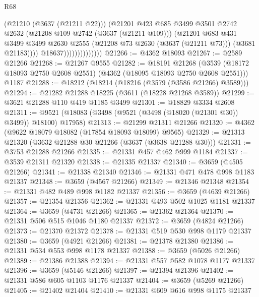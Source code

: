 \begin{lexlean}{R68}
\begin{coremodule}
                                  (@21210 (@3637 (@21211 @22)))
                                  (@21201
                                    @423
                                    @685
                                    @3499
                                    @3501
                                    @2742
                                    @2632
                                    (@21208 @109 @2742 (@3637 (@21211 @109)))
                                    (@21201
                                      @683
                                      @431
                                      @3499
                                      @3499
                                      @2630
                                      @2555
                                      (@21208 @73 @2630 (@3637 (@21211 @73)))
                                      (@3681 @21183))))
                                @18637))))))))))))))
@21266 := @4362 @18093
@21267 := @2589 @21266
@21268 := @21267 @9555
@21282 := @18191
    @21268
    (@3539 (@18172 @18093 @2750 @2608 @2551) (@4362 (@18095 @18093 @2750 @2608 @2551)))
    @1187
@21288 := @18212 (@18214 (@18216 (@3579 (@3586 @21266) @3589)))
@21294 := @21282 @21288 @18225 (@3611 (@18228 @21268 @3589))
@21299 := @3621 @21288 @110 @419 @1185 @3499
@21301 := @18829 @3334 @2608
@21311 := @9521 (@18083 (@3498 (@9521 (@3498 (@18020 (@21301 @30)) @3499)) @18100) @17958)
@21313 := @21299 @21311 @21266
@21320 := @4362 (@9622 @18079 @18082 (@17854 @18093 @18099) @9565)
@21329 := @21313 @21320 (@3632 @21288 @30 @21266 (@3637 (@3638 @21288 @30)))
@21331 := @3753 @21288 @21266
@21335 := @21331 @457 @462 @999 @1184
@21337 := @3539 @21311 @21320
@21338 := @21335 @21337
@21340 := @3659 (@4505 @21266)
@21341 := @21338 @21340
@21346 := @21331 @471 @478 @998 @1183 @21337
@21348 := @3659 (@4567 @21266)
@21349 := @21346 @21348
@21354 := @21331 @482 @489 @998 @1182 @21337
@21356 := @3659 (@4639 @21266)
@21357 := @21354 @21356
@21362 := @21331 @493 @502 @1025 @1181 @21337
@21364 := @3659 (@4731 @21266)
@21365 := @21362 @21364
@21370 := @21331 @506 @515 @1046 @1180 @21337
@21372 := @3659 (@4824 @21266)
@21373 := @21370 @21372
@21378 := @21331 @519 @530 @998 @1179 @21337
@21380 := @3659 (@4921 @21266)
@21381 := @21378 @21380
@21386 := @21331 @534 @553 @998 @1178 @21337
@21388 := @3659 (@5026 @21266)
@21389 := @21386 @21388
@21394 := @21331 @557 @582 @1078 @1177 @21337
@21396 := @3659 (@5146 @21266)
@21397 := @21394 @21396
@21402 := @21331 @586 @605 @1103 @1176 @21337
@21404 := @3659 (@5269 @21266)
@21405 := @21402 @21404
@21410 := @21331 @609 @616 @998 @1175 @21337

\end{coremodule}
\end{lexlean}
